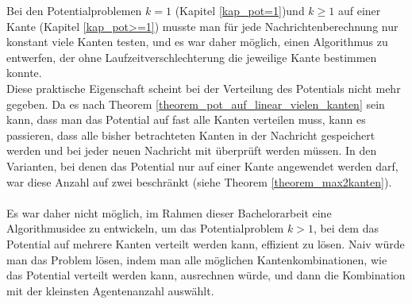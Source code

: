 Bei den Potentialproblemen $k = 1$ (Kapitel \ref{kap_pot=1})und $k \geq 1$ auf einer Kante (Kapitel \ref{kap_pot>=1}) musste man für jede Nachrichtenberechnung nur konstant viele Kanten testen, und es war daher möglich, einen Algorithmus zu entwerfen, der ohne Laufzeitverschlechterung die jeweilige Kante bestimmen konnte.
\\
Diese praktische Eigenschaft scheint bei der Verteilung des Potentials nicht mehr gegeben. Da es nach Theorem \ref{theorem_pot_auf_linear_vielen_kanten} sein kann, dass man das Potential auf fast alle Kanten verteilen muss, kann es passieren, dass alle bisher betrachteten Kanten in der Nachricht gespeichert werden und bei jeder neuen Nachricht mit überprüft werden müssen. In den Varianten, bei denen das Potential nur auf einer Kante angewendet werden darf, war diese Anzahl auf zwei beschränkt (siehe Theorem \ref{theorem_max2kanten}).
\\
\\
Es war daher nicht möglich, im Rahmen dieser Bachelorarbeit eine Algorithmusidee zu entwickeln, um das Potentialproblem $k > 1$, bei dem das Potential auf mehrere Kanten verteilt werden kann, effizient zu lösen. Naiv würde man das Problem lösen, indem man alle möglichen Kantenkombinationen, wie das Potential verteilt werden kann, ausrechnen würde, und dann die Kombination mit der kleinsten Agentenanzahl auswählt.


